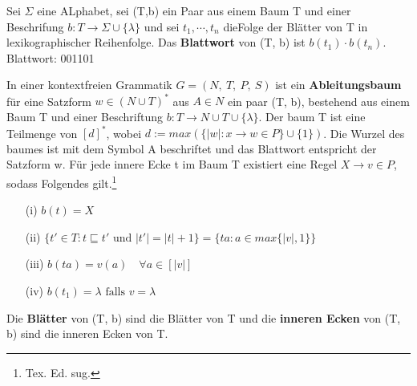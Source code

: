     Sei \(\Sigma\) eine ALphabet, sei (T,b) ein Paar aus einem Baum T und einer Beschrifung \(b: T \to \Sigma \cup \{\lambda\}\) und sei \(t_1, \cdots, t_n\) dieFolge der Blätter von T in lexikographischer Reihenfolge. Das \textbf{Blattwort} von (T, b) ist \(b(t_1) \cdot b(t_n)\). Blattwort: 001101
    {
    }
\newpage
{} 
    In einer kontextfreien Grammatik \(G = (N,\ T,\ P,\ S)\) ist ein \textbf{Ableitungsbaum} für eine Satzform \(w \in (N \cup T)^*\) aus \(A \in N\) ein paar (T, b), bestehend aus einem Baum T und einer Beschriftung \(b: T \to N \cup T \cup \{\lambda\}\). Der baum T ist eine Teilmenge von \([d]^*\), wobei \(d:= max (\{|w|: x \to w \in P\} \cup \{1\})\). Die Wurzel des baumes ist mit dem Symbol A beschriftet und das Blattwort entspricht der Satzform w. Für jede innere Ecke t im Baum T existiert eine Regel \(X \to v \in P\), sodass Folgendes gilt.\footnote{Tex. Ed. sug.}
    \begin{itemize}
        \item [(i)] \(b(t) = X\)
        \item [(ii)] \(\{t' \in T : t \sqsubseteq t' \text{ und } |t'| = |t| + 1\} = \{ta : a \in max \{|v|, 1\}\}\)
        \item [(iii)] \(b(ta) = v(a) \quad \forall a \in [|v|]\)
        \item [(iv)] \(b(t_1) = \lambda \text{ falls } v = \lambda\)
    \end{itemize}
    Die \textbf{Blätter} von (T, b) sind die Blätter von T und die \textbf{inneren Ecken} von (T, b) sind die inneren Ecken von T.

